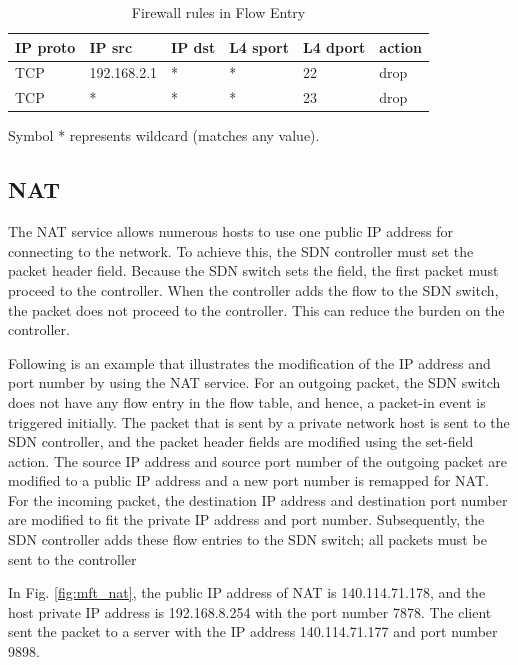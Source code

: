 \begin{table}[!t]
\caption{Firewall rules in Flow Entry}
\label{table:fw}
\centering
\begin{threeparttable}
\begin{tabular}{|l|l|l|l|l|l|}
\hline
IP proto & IP src      & IP dst       & L4 sport & L4 dport & action \\ \hline
TCP      & 192.168.2.1 & *            & *        & 22       & drop   \\ \hline
TCP      & *           & *            & *        & 23       & drop   \\ \hline
\end{tabular}
  \begin{tablenotes}
    \item[] Symbol * represents wildcard (matches any value).
  \end{tablenotes}
\end{threeparttable}
\end{table}


\subsection{NAT}
The NAT service allows numerous hosts to use one public IP address for connecting to the network. To achieve this, the SDN controller must set the packet header field. Because the SDN switch sets the field, the first packet must proceed to the controller. When the controller adds the flow to the SDN switch, the packet does not proceed to the controller. This can reduce the burden on the controller.

Following is an example that illustrates the modification of the IP address and port number by using the NAT service. For an outgoing packet, the SDN switch does not have any flow entry in the flow table, and hence, a packet-in event is triggered initially. The packet that is sent by a private network host is sent to the SDN controller, and the packet header fields are modified using the set-field action. The source IP address and source port number of the outgoing packet are modified to a public IP address and a new port number is remapped for NAT. For the incoming packet, the destination IP address and destination port number are modified to fit the private IP address and port number. Subsequently, the SDN controller adds these flow entries to the SDN switch; all packets must be sent to the controller

In Fig. \ref{fig:mft_nat}, the public IP address of NAT is 140.114.71.178, and the host private IP address is 192.168.8.254 with the port number 7878. The client sent the packet to a server with the IP address 140.114.71.177 and port number 9898.

